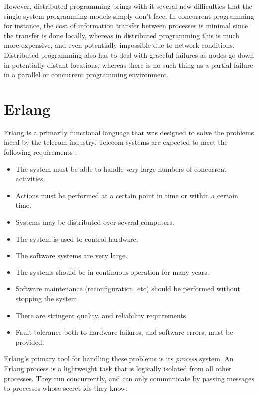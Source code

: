 \documentclass[10pt,a4paper,twocolumn]{article}
\begin{document}
However, distributed programming brings with it several new difficulties that
the single system programming models simply don't face. In concurrent
programming for instance, the cost of information transfer between processes is
minimal since the transfer is done locally, whereas in distributed programming
this is much more expensive, and even potentially impossible due to network
conditions. Distributed programming also has to deal with graceful failures as
nodes go down in potentially distant locations, whereas there is no such thing
as a partial failure in a parallel or concurrent programming environment.

\section{Erlang}

Erlang is a primarily functional language that was designed to solve the
problems faced by the telecom industry. Telecom systems are expected to meet the
following requirements \cite{dacker2000concurrent}:

\begin{itemize}
    \item The system must be able to handle very large numbers of concurrent activities.
    \item Actions must be performed at a certain point in time or within a certain time.
    \item Systems may be distributed over several computers.
    \item The system is used to control hardware.
    \item The software systems are very large.
    \item The systems should be in continuous operation for many years.
    \item Software maintenance (reconfiguration, etc) should be performed without stopping the system.
    \item There are stringent quality, and reliability requirements.
    \item Fault tolerance both to hardware failures, and software errors, must be provided.
\end{itemize}

Erlang's primary tool for handling these problems is its \emph{process} system.
\cite{erlangthesis} An Erlang process is a lightweight task that is logically
isolated from all other processes. They run concurrently, and can only
communicate by passing messages to processes whose secret ids they know.
\end{document}
